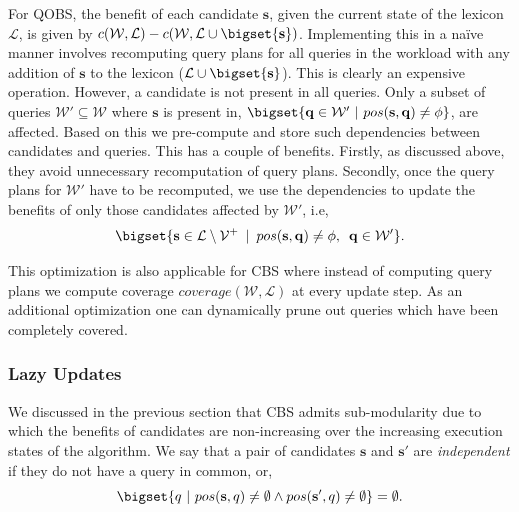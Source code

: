 For QOBS, the benefit of each candidate $\mathbf{s}$, given the current state of the lexicon $\mathcal{L}$, is given by $c(\mathcal{W}, \mathcal{L}) - c(\mathcal{W}, \mathcal{L} \cup \bigset{\mathbf{s}})$. Implementing this in a na\"ive manner involves recomputing query plans for all queries in the workload with any addition of $\mathbf{s}$ to the lexicon ($ \mathcal{L} \cup \bigset{\mathbf{s}}$). This is clearly an expensive operation. However, a candidate is not present in all queries. Only a subset of queries $\mathcal{W}' \subseteq \mathcal{W}$ where $\mathbf{s}$ is present in, $\bigset{ \mathbf{q} \in \mathcal{W}' ~|~ pos(\mathbf{s}, \mathbf{q}) \neq \phi}$, are affected. Based on this we pre-compute and store such dependencies between candidates and queries. This has a couple of benefits. Firstly, as discussed above, they avoid unnecessary recomputation of query plans. Secondly, once the query plans for $\mathcal{W}'$ have to be recomputed, we use the dependencies to update the benefits of only those candidates affected by $\mathcal{W}'$, i.e, 
$$
\bigset{ \mathbf{s} \in \mathcal{L} \setminus \mathcal{V}^+ \,\,\,|\,\,\, pos(\mathbf{s}, \mathbf{q}) \neq \phi, \,\,\,\mathbf{q} \in \mathcal{W}'}.
$$ 

This optimization is also applicable for CBS where instead of computing query plans we compute coverage $coverage(\mathcal{W}, \mathcal{L})$ at every update step. As an additional optimization one can dynamically prune out queries which have been completely covered.


\subsubsection{Lazy Updates}
We discussed in the previous section that CBS admits sub-modularity due to which the benefits of candidates are non-increasing over the increasing execution states of the algorithm. We say that a pair of candidates $\mathbf{s}$ and $\mathbf{s}'$ are \emph{independent} if they do not have a query in common, or, 
$$
   \bigset{ q \,\,|\,\, pos(\mathbf{s}, q) \neq \emptyset \wedge pos(\mathbf{s}', q) \neq \emptyset } = \emptyset.  
$$

